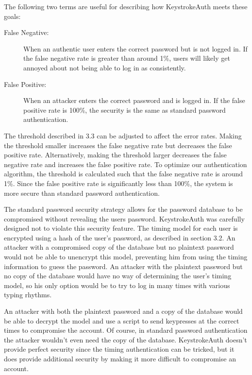 \documentclass{article}
\begin{document}
The following two terms are useful for describing how KeystrokeAuth meets these goals:

\begin{description}
  \item[False Negative:] When an authentic user enters the correct password but is not logged in. If the false negative rate is greater than around 1\%, users will likely get annoyed about not being able to log in as consistently.
  \item[False Positive:] When an attacker enters the correct password and is logged in. If the false positive rate is 100\%, the security is the same as standard password authentication.
\end{description}

The threshold described in 3.3 can be adjusted to affect the error rates. 
Making the threshold smaller increases the false negative rate but decreases the false positive rate.
Alternatively, making the threshold larger decreases the false negative rate and increases the false positive rate. 
To optimize our authentication algorithm, the threshold is calculated such that the false negative rate is around 1\%.
Since the false positive rate is significantly less than 100\%, the system is more secure than standard password authentication.

The standard password security strategy allows for the password database to be compromised without revealing the users password.
KeystrokeAuth was carefully designed not to violate this security feature.
The timing model for each user is encrypted using a hash of the user's password, as described in section 3.2. 
An attacker with a compromised copy of the database but no plaintext password would not be able to unencrypt this model, preventing him from using the timing information to guess the password.
An attacker with the plaintext password but no copy of the database would have no way of determining the user's timing model, so his only option would be to try to log in many times with various typing rhythms. 

An attacker with both the plaintext password and a copy of the database would be able to decrypt the model and use a script to send keypresses at the correct times to compromise the account. 
Of course, in standard password authentication the attacker wouldn't even need the copy of the database.
KeystrokeAuth doesn't provide perfect security since the timing authentication can be tricked, but it does provide additional security by making it more difficult to compromise an account.
\end{document}
